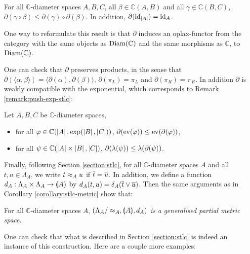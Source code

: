 \begin{proposition} For all $\mathbb{C}$-diameter spaces $A, B, C$, all $\beta \in \mathbb{C}(A, B)$ and all $\gamma \in \mathbb{C}(B, C)$, $\partial(\gamma \circ \beta) \leq \partial(\gamma) \circ \partial(\beta)$. In addition, $\partial(\operatorname{id}_{\left\vert A\right\vert}) = \operatorname{id}_A$.
\end{proposition}
 
One way to reformulate this result is that $\partial$ induces an oplax-functor from the category with the same objects as $\operatorname{Diam}(\mathbb{C})$ and the same morphisms as $\mathbb{C}$, to $\operatorname{Diam}(\mathbb{C})$.

One can check that $\partial$ preserves products, in the sense that $\partial (\langle \alpha, \beta \rangle) = \langle\partial(\alpha), \partial(\beta)\rangle$, $\partial(\pi_L) = \pi_L$ and $\partial(\pi_R) = \pi_R$. In addition $\partial$ is weakly compatible with the exponential, which corresponds to Remark \ref{remark:push-exp-stlc}:

\begin{proposition} Let $A, B, C$ be $\mathbb{C}$-diameter spaces, \begin{itemize}
\item for all $\varphi \in \mathbb{C}(\left\vert A\right\vert, \exp(\left\vert B\right\vert, \left\vert C\right\vert))$, $\partial(\operatorname{ev}(\varphi)) \leq \operatorname{ev}(\partial(\varphi))$,
\item for all $\psi \in \mathbb{C}(\left\vert A\right\vert\times\left\vert B\right\vert, \left\vert C\right\vert)$, $\partial(\lambda(\psi)) \leq \lambda(\partial(\psi))$.
\end{itemize}
\end{proposition}

Finally, following Section \ref{section:stlc}, for all $\mathbb{C}$-diameter spaces $A$ and all  $t,u \in \Lambda_A$, we write $t \approx_A u$ if $\overline{t} = \overline{u}$. In addition, we define a function $d_A : \Lambda_A \times \Lambda_A \to \llparenthesis A \rrparenthesis$ by $d_A(t,u) = \delta_A(\overline{t} \vee \overline{u})$. Then the same arguments as in Corollary \ref{corollary:stlc-metric} show that:

\begin{proposition} For all $\mathbb{C}$-diameter spaces $A$, \emph{$(\Lambda_{A}/\approx_{A}, \llparenthesis A \rrparenthesis, d_{A})$ is a generalised partial metric space}.
\end{proposition}

One can check that what is described in Section \ref{section:stlc} is indeed an instance of this construction. Here are a couple more examples:

